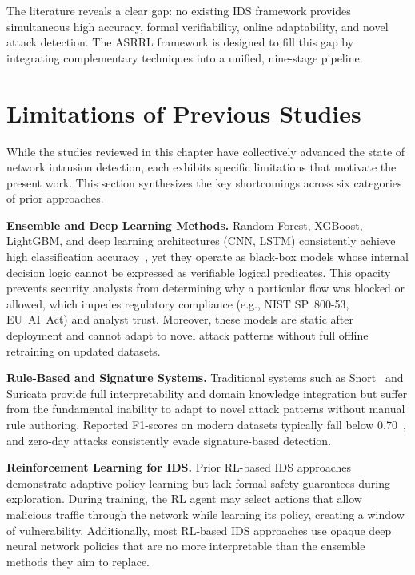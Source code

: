 \documentclass[12pt, letterpaper, oneside]{report}
\newcommand{\ASRRL}{\textsc{ASRRL}}
\begin{document}
The literature reveals a clear gap: no existing IDS framework provides simultaneous high accuracy, formal verifiability, online adaptability, and novel attack detection. The \ASRRL{} framework is designed to fill this gap by integrating complementary techniques into a unified, nine-stage pipeline.

\section{Limitations of Previous Studies}
\label{sec:lit_limitations}

While the studies reviewed in this chapter have collectively advanced the state of network intrusion detection, each exhibits specific limitations that motivate the present work. This section synthesizes the key shortcomings across six categories of prior approaches.

\textbf{Ensemble and Deep Learning Methods.} Random Forest, XGBoost, LightGBM, and deep learning architectures (CNN, LSTM) consistently achieve high classification accuracy~\citep{buczak2016,ahmad2021}, yet they operate as black-box models whose internal decision logic cannot be expressed as verifiable logical predicates. This opacity prevents security analysts from determining why a particular flow was blocked or allowed, which impedes regulatory compliance (e.g., NIST SP~800-53, EU~AI~Act) and analyst trust. Moreover, these models are static after deployment and cannot adapt to novel attack patterns without full offline retraining on updated datasets.

\textbf{Rule-Based and Signature Systems.} Traditional systems such as Snort~\citep{roesch1999} and Suricata provide full interpretability and domain knowledge integration but suffer from the fundamental inability to adapt to novel attack patterns without manual rule authoring. Reported F1-scores on modern datasets typically fall below 0.70~\citep{ahmad2021}, and zero-day attacks consistently evade signature-based detection.

\textbf{Reinforcement Learning for IDS.} Prior RL-based IDS approaches demonstrate adaptive policy learning but lack formal safety guarantees during exploration. During training, the RL agent may select actions that allow malicious traffic through the network while learning its policy, creating a window of vulnerability. Additionally, most RL-based IDS approaches use opaque deep neural network policies that are no more interpretable than the ensemble methods they aim to replace.
\end{document}
